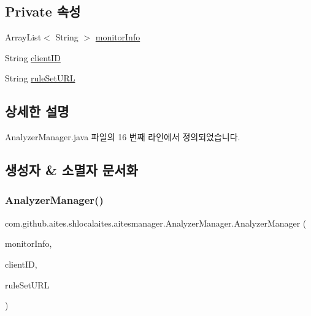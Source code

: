 \subsection*{Private 속성}
\begin{DoxyCompactItemize}
\item 
Array\+List$<$ String $>$ \mbox{\hyperlink{classcom_1_1github_1_1aites_1_1shlocalaites_1_1aitesmanager_1_1_analyzer_manager_a158935ea553bae7475409e5a065d6576}{monitor\+Info}}
\item 
String \mbox{\hyperlink{classcom_1_1github_1_1aites_1_1shlocalaites_1_1aitesmanager_1_1_analyzer_manager_a4c88d935af5617842aecd9686483de67}{client\+ID}}
\item 
String \mbox{\hyperlink{classcom_1_1github_1_1aites_1_1shlocalaites_1_1aitesmanager_1_1_analyzer_manager_af225145a9ef067c87f773bbef60ec5d8}{rule\+Set\+U\+RL}}
\end{DoxyCompactItemize}


\subsection{상세한 설명}


Analyzer\+Manager.\+java 파일의 16 번째 라인에서 정의되었습니다.



\subsection{생성자 \& 소멸자 문서화}
\mbox{\label{classcom_1_1github_1_1aites_1_1shlocalaites_1_1aitesmanager_1_1_analyzer_manager_afb105caa43f6a8b8dac34b82fe2dd5fb}} 
\subsubsection{\texorpdfstring{Analyzer\+Manager()}{AnalyzerManager()}}
{\footnotesize\ttfamily com.\+github.\+aites.\+shlocalaites.\+aitesmanager.\+Analyzer\+Manager.\+Analyzer\+Manager (\begin{DoxyParamCaption}\item[{Array\+List$<$ String $>$}]{monitor\+Info,  }\item[{String}]{client\+ID,  }\item[{String}]{rule\+Set\+U\+RL }\end{DoxyParamCaption})}



